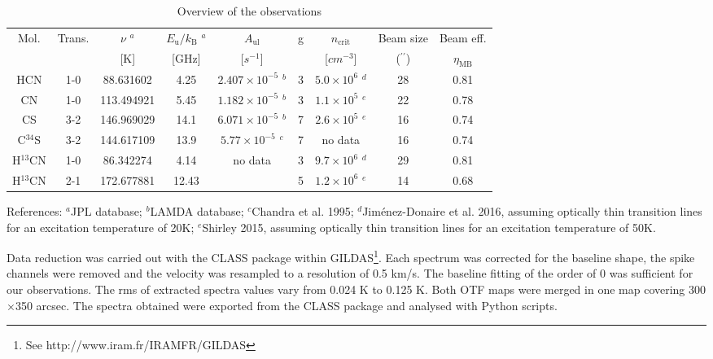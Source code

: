 \documentclass{aa}
\begin{document}
\begin{table*}
\caption{Overview of the observations}             %
\label{table:1}      %
\centering                          %
\begin{tabular}{c c c c c c c c c}        %
\hline\hline                 %
Mol. & Trans. & $\nu$ $^a$ & $E_\mathrm{u}/k_\mathrm{B}$ $^a$&  $A_\mathrm{ul}$ & g & $n_\mathrm{crit}$ &Beam size & Beam eff.\\
 & & [K] & [GHz] & [$s^{-1}$] & & [$cm^{-3}$] & ($^{\prime\prime}$) & $\eta_\mathrm{MB}$\\
\hline                        %
HCN & 1-0 & 88.631602 & 4.25 & $2.407 \times 10^{-5}$ $^b$ & 3 & $5.0 \times 10^{6}$ $^d$ & 28 & 0.81\\
CN & 1-0 & 113.494921 & 5.45 & $1.182 \times 10^{-5}$ $^b$& 3 & $1.1 \times 10^{5}$ $^e$& 22 & 0.78\\
CS & 3-2 & 146.969029 & 14.1 & $6.071 \times 10^{-5}$ $^b$& 7 &$2.6 \times 10^{5}$ $^e$ & 16 & 0.74\\
C$^{34}$S & 3-2 & 144.617109 & 13.9 & $5.77 \times 10^{-5}$ $^c$ & 7 & no data & 16 & 0.74\\
H$^{13}$CN & 1-0 & 86.342274 & 4.14 & \multirow{2}{*}{no data} & 3 & $9.7 \times 10^{6}$ $^d$ & 29 & 0.81\\
H$^{13}$CN & 2-1 & 172.677881 & 12.43 & & 5 & $1.2 \times 10^{6}$ $^e$ & 14 & 0.68\\
\hline                                   
\end{tabular}
\begin{flushleft}
References: 
$^a$JPL database; 
$^b$LAMDA database;
$^c$Chandra et al. 1995;
$^d$Jim\'enez-Donaire et al. 2016, assuming optically thin transition lines for an excitation temperature of 20K;
$^e$Shirley 2015, assuming optically thin transition lines for an excitation temperature of 50K.

\end{flushleft}
\end{table*}

Data reduction was carried out with the CLASS package within GILDAS\footnote{See http://www.iram.fr/IRAMFR/GILDAS}. Each spectrum was corrected for the baseline shape, the spike channels were removed and the velocity was resampled to a resolution of 0.5 km/s. The baseline fitting of the order of 0 was sufficient for our observations. The rms of extracted spectra values vary from 0.024 K to 0.125 K. Both OTF maps were merged in one map covering 300$\times$350 arcsec. The spectra obtained were exported from the CLASS package and analysed with Python scripts. 
\end{document}
